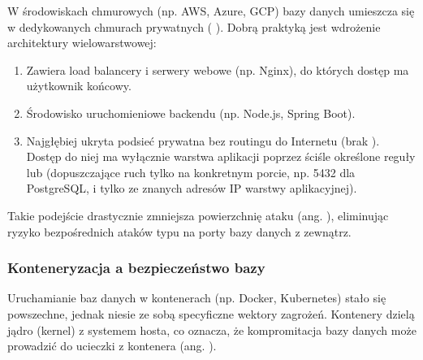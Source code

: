 \documentclass[letterpaper,10pt,polish]{sphinxmanual}
\begin{document}
\sphinxAtStartPar
W środowiskach chmurowych (np. AWS, Azure, GCP) bazy danych umieszcza się w dedykowanych chmurach prywatnych ( \sphinxhyphen{} ). Dobrą praktyką jest wdrożenie architektury wielowarstwowej:
\begin{enumerate}
%
\item {} 
\sphinxAtStartPar
{} Zawiera load balancery i serwery webowe (np. Nginx), do których dostęp ma użytkownik końcowy.

\item {} 
\sphinxAtStartPar
{} Środowisko uruchomieniowe backendu (np. Node.js, Spring Boot).

\item {} 
\sphinxAtStartPar
{} Najgłębiej ukryta podsieć prywatna bez routingu do Internetu (brak ). Dostęp do niej ma wyłącznie warstwa aplikacji poprzez ściśle określone reguły  lub  (dopuszczające ruch tylko na konkretnym porcie, np. 5432 dla PostgreSQL, i tylko ze znanych adresów IP warstwy aplikacyjnej).

\end{enumerate}

\sphinxAtStartPar
Takie podejście drastycznie zmniejsza powierzchnię ataku (ang. ), eliminując ryzyko bezpośrednich ataków typu  na porty bazy danych z zewnątrz.


\subsubsection{Konteneryzacja a bezpieczeństwo bazy}
\label{\detokenize{rozdzia_u0142_2/rozdzia_u0142_27/rozdzial_1:konteneryzacja-a-bezpieczenstwo-bazy}}
\sphinxAtStartPar
Uruchamianie baz danych w kontenerach (np. Docker, Kubernetes) stało się powszechne, jednak niesie ze sobą specyficzne wektory zagrożeń. Kontenery dzielą jądro (kernel) z systemem hosta, co oznacza, że kompromitacja bazy danych może prowadzić do ucieczki z kontenera (ang. ).
\end{document}
